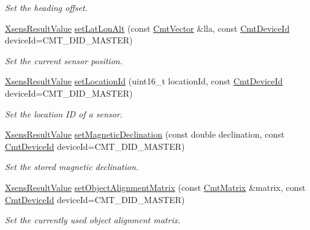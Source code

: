 \begin{DoxyCompactItemize}
\begin{DoxyCompactList}\small\item\em \-Set the heading offset. \end{DoxyCompactList}\item 
\hyperlink{group__enums_ga822a2260a20af524029eef9e9a51ff6f}{\-Xsens\-Result\-Value} \hyperlink{classxsens_1_1Cmt3_acdbb3a586e80b79de57f0632da0a932e}{set\-Lat\-Lon\-Alt} (const \hyperlink{structCmtVector}{\-Cmt\-Vector} \&lla, const \hyperlink{cmtdef_8h_a2e3b6a17360828d440ee848959918af2}{\-Cmt\-Device\-Id} device\-Id=\-C\-M\-T\-\_\-\-D\-I\-D\-\_\-\-M\-A\-S\-T\-E\-R)
\begin{DoxyCompactList}\small\item\em \-Set the current sensor position. \end{DoxyCompactList}\item 
\hyperlink{group__enums_ga822a2260a20af524029eef9e9a51ff6f}{\-Xsens\-Result\-Value} \hyperlink{classxsens_1_1Cmt3_a675cdbb0a565ae5a7b7d7e5a94f172d4}{set\-Location\-Id} (uint16\-\_\-t location\-Id, const \hyperlink{cmtdef_8h_a2e3b6a17360828d440ee848959918af2}{\-Cmt\-Device\-Id} device\-Id=\-C\-M\-T\-\_\-\-D\-I\-D\-\_\-\-M\-A\-S\-T\-E\-R)
\begin{DoxyCompactList}\small\item\em \-Set the location \-I\-D of a sensor. \end{DoxyCompactList}\item 
\hyperlink{group__enums_ga822a2260a20af524029eef9e9a51ff6f}{\-Xsens\-Result\-Value} \hyperlink{classxsens_1_1Cmt3_a2033da72e7688e152e427bacf1438b3f}{set\-Magnetic\-Declination} (const double declination, const \hyperlink{cmtdef_8h_a2e3b6a17360828d440ee848959918af2}{\-Cmt\-Device\-Id} device\-Id=\-C\-M\-T\-\_\-\-D\-I\-D\-\_\-\-M\-A\-S\-T\-E\-R)
\begin{DoxyCompactList}\small\item\em \-Set the stored magnetic declination. \end{DoxyCompactList}\item 
\hyperlink{group__enums_ga822a2260a20af524029eef9e9a51ff6f}{\-Xsens\-Result\-Value} \hyperlink{classxsens_1_1Cmt3_affc8bb2442a1abea3cbea3c88ff8b5bc}{set\-Object\-Alignment\-Matrix} (const \hyperlink{structCmtMatrix}{\-Cmt\-Matrix} \&matrix, const \hyperlink{cmtdef_8h_a2e3b6a17360828d440ee848959918af2}{\-Cmt\-Device\-Id} device\-Id=\-C\-M\-T\-\_\-\-D\-I\-D\-\_\-\-M\-A\-S\-T\-E\-R)
\begin{DoxyCompactList}\small\item\em \-Set the currently used object alignment matrix. \end{DoxyCompactList}\item 

\end{DoxyCompactItemize}
